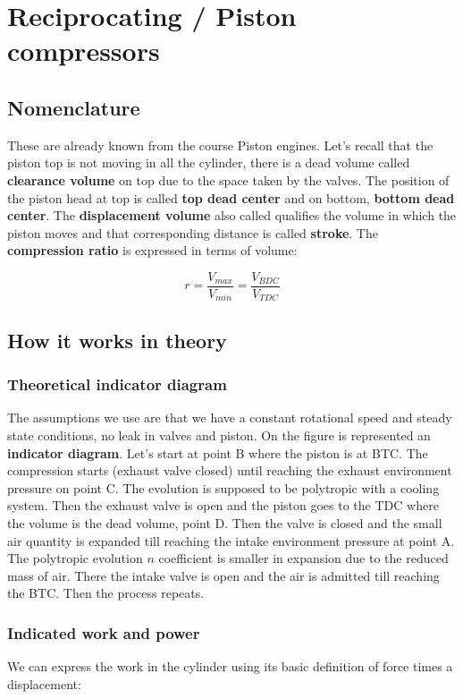 \section{Reciprocating / Piston compressors}
\subsection{Nomenclature}

These are already known from the course Piston engines. Let's recall that the piston top is not moving in all the cylinder, there is a dead volume called \textbf{clearance volume} on top due to the space taken by the valves. The position of the piston head at top is called \textbf{top dead center} and on bottom, \textbf{bottom dead center}. The \textbf{displacement volume} also called qualifies the volume in which the piston moves and that corresponding distance is called \textbf{stroke}. The \textbf{compression ratio} is expressed in terms of volume: 

\begin{equation}
r = \frac{V_{max}}{V_{min}} = \frac{V_{BDC}}{V_{TDC}}
\end{equation}

\subsection{How it works in theory}
\subsubsection{Theoretical indicator diagram}
The assumptions we use are that we have a constant rotational speed and steady state conditions, no leak in valves and piston. On the figure is represented an \textbf{indicator diagram}. Let's start at point B where the piston is at BTC. The compression starts (exhaust valve closed) until reaching the exhaust environment pressure on point C. The evolution is supposed to be polytropic with a cooling system. Then the exhaust valve is open and the piston goes to the TDC where the volume is the dead volume, point D. Then the valve is closed and the small air quantity is expanded till reaching the intake environment pressure at point A. The polytropic evolution $n$ coefficient is smaller in expansion due to the reduced mass of air. There the intake valve is open and the air is admitted till reaching the BTC. Then the process repeats.

\subsubsection{Indicated work and power}
We can express the work in the cylinder using its basic definition of force times a displacement: 

